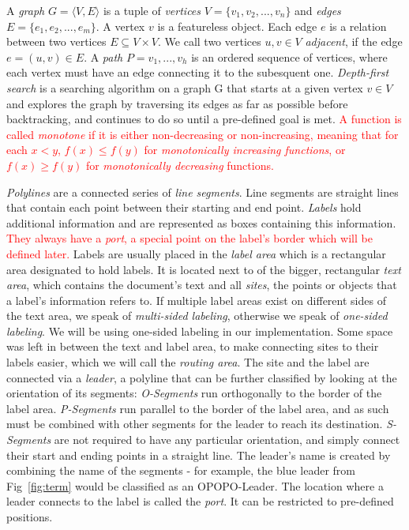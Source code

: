 \documentclass[11pt,a4paper]{vutinfth}
\newcommand{\change}[1]{\textcolor{red}{#1}}
\begin{document}
A \emph{graph} $G=\langle V, E \rangle$ is a tuple of \emph{vertices} $V=\{v_1, v_2, ..., v_n\}$ and \emph{edges} $E=\{e_1, e_2, ..., e_m\}$. A vertex $v$ is a featureless object. %
 Each edge $e$ is a relation between two vertices $E \subseteq V\times V$. %
We call two vertices $u,v \in V$ \emph{adjacent}, if the edge $e=(u,v) \in E$.
 A \emph{path} $P=v_1, ..., v_h$ is an ordered sequence of vertices, where each vertex must have an edge connecting it to the subesquent one.
 \emph{Depth-first search} is a searching algorithm on a graph G that starts at a given vertex $v \in V$ and explores the graph by traversing its edges as far as possible before backtracking, and continues to do so until a pre-defined goal is met. 
\change{A function is called \emph{monotone} if it is either non-decreasing or non-increasing, meaning that for each $x<y$, $f(x) \leq f(y)$ for \emph{monotonically increasing functions}, or $f(x) \geq f(y)$ for \emph{monotonically decreasing} functions.}

\emph{Polylines} are a connected series of \emph{line segments}. Line segments are straight lines that contain each point between their starting and end point. 
\emph{Labels} hold additional information and are represented as boxes containing this information. \change{They always have a \emph{port}, a special point on the label's border which will be defined later.} Labels are usually placed in the \emph{label area} which is a rectangular area designated to hold labels. It is located next to of the bigger, rectangular \emph{text area}, which contains the document's text and all \emph{sites}, the points or objects that a label's information refers to. If multiple label areas exist on different sides of the text area, we speak of \emph{multi-sided labeling}, otherwise we speak of \emph{one-sided labeling}. We will be using one-sided labeling in our implementation. Some space was left in between the text and label area, to make connecting sites to their labels easier, which we will call the \emph{routing area}. The site and the label are connected via a \emph{leader}, a polyline that can be further classified by looking at the orientation of its segments: \emph{O-Segments} run orthogonally to the border of the label area. \emph{P-Segments} run parallel to the border of the label area, and as such must be combined with other segments for the leader to reach its destination. \emph{S-Segments} are not required to have any particular orientation, and simply connect their start and ending points in a straight line.
The leader's name is created by combining the name of the segments - for example, the blue leader from Fig~\ref{fig:term} would be classified as an OPOPO-Leader.
The location where a leader connects to the label is called the \emph{port}. It can be restricted to pre-defined positions. %
\end{document}
